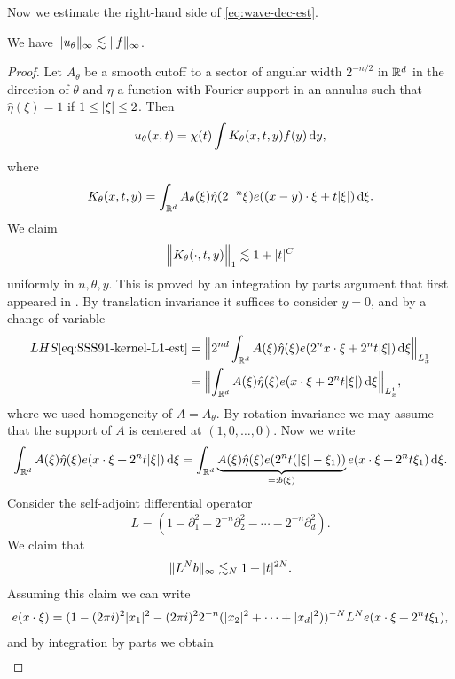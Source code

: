Now we estimate the right-hand side of \eqref{eq:wave-dec-est}.
\begin{lemma}
\label{lem:cone-single-sector}
We have $\norm{u_{\theta}}_{\infty} \lesssim \norm{f}_{\infty}$.
\end{lemma}
\begin{proof}
Let $A_{\theta}$ be a smooth cutoff to a sector of angular width $2^{-n/2}$ in $\R^{d}$ in the direction of $\theta$ and $\eta$ a function with Fourier support in an annulus such that $\hat{\eta}(\xi)=1$ if $1 \leq \abs{\xi} \leq 2$.
Then
\[
u_{\theta}(x,t) = \chi(t) \int K_{\theta}(x,t,y) f(y) \dif y,
\]
where
\[
K_{\theta}(x,t,y) = \int_{\R^{d}} A_{\theta}(\xi) \hat{\eta}(2^{-n}\xi) e((x-y)\cdot \xi + t \abs{\xi}) \dif\xi.
\]
We claim
\begin{equation}
\label{eq:SSS91-kernel-L1-est}
\norm[\Big]{K_{\theta}(\cdot,t,y)}_{1}
\lesssim 1 + \abs{t}^{C}
\end{equation}
uniformly in $n,\theta,y$.
This is proved by an integration by parts argument that first appeared in \cite[p.\ 240]{MR1127475}.
By translation invariance it suffices to consider $y=0$, and by a change of variable
\begin{align*}
LHS\eqref{eq:SSS91-kernel-L1-est}
&=
\norm[\Big]{ 2^{nd} \int_{\R^{d}} A(\xi) \hat{\eta}(\xi) e(2^{n} x \cdot \xi + 2^{n} t \abs{\xi}) \dif\xi }_{L^{1}_{x}}\\
&=
\norm[\Big]{ \int_{\R^{d}} A(\xi) \hat{\eta}(\xi) e(x \cdot \xi + 2^{n} t \abs{\xi}) \dif\xi }_{L^{1}_{x}},
\end{align*}
where we used homogeneity of $A=A_{\theta}$.
By rotation invariance we may assume that the support of $A$ is centered at $(1,0,\dotsc,0)$.
Now we write
\[
\int_{\R^{d}} A(\xi) \hat{\eta}(\xi) e(x \cdot \xi + 2^{n} t \abs{\xi}) \dif\xi
=
\int_{\R^{d}} \underbrace{A(\xi) \hat{\eta}(\xi) e(2^{n} t (\abs{\xi}-\xi_{1}))}_{=:b(\xi)} e(x \cdot \xi + 2^{n} t \xi_{1}) \dif\xi.
\]
Consider the self-adjoint differential operator
\[
L = (1 - \partial_{1}^{2} -2^{-n}\partial_{2}^{2}-\dotsb-2^{-n}\partial_{d}^{2}).
\]
We claim that
\begin{equation}
\label{eq:LNb-unif-bound}
\norm{L^{N} b}_{\infty} \lesssim_{N} 1 + \abs{t}^{2N}.
\end{equation}
Assuming this claim we can write
\[
e(x \cdot \xi) =
(1-(2\pi i)^{2} \abs{x_{1}}^{2}-(2\pi i)^{2} 2^{-n} (\abs{x_{2}}^{2} + \dotsb + \abs{x_{d}}^{2}))^{-N} L^{N} e(x \cdot \xi + 2^{n} t \xi_{1}),
\]
and by integration by parts we obtain
\begin{multline*}

\end{multline*}
\end{proof}
